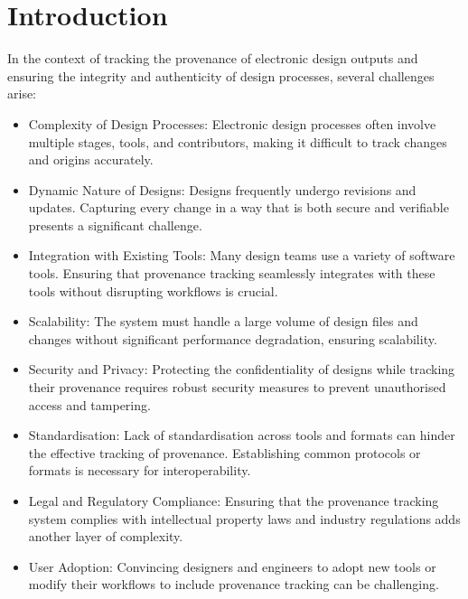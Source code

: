 \documentclass{tufte-handout}
\begin{document}
\section{Introduction}
In the context of tracking the provenance of electronic design outputs and ensuring the integrity and authenticity of design processes, several challenges arise:
\begin{itemize}
    \item Complexity of Design Processes: Electronic design processes often involve multiple stages, tools, and contributors, making it difficult
    to track changes and origins accurately.
    \item Dynamic Nature of Designs: Designs frequently undergo revisions and updates. Capturing every change in a way that is both secure and verifiable
    presents a significant challenge.
    \item Integration with Existing Tools: Many design teams use a variety of software tools. Ensuring that provenance tracking seamlessly integrates with
    these tools without disrupting workflows is crucial.
    \item Scalability: The system must handle a large volume of design files and changes without significant performance degradation, ensuring scalability.
    \item Security and Privacy: Protecting the confidentiality of designs while tracking their provenance requires robust security measures to prevent unauthorised
    access and tampering.
    \item Standardisation: Lack of standardisation across tools and formats can hinder the effective tracking of provenance. Establishing common protocols or
    formats is necessary for interoperability.
    \item Legal and Regulatory Compliance: Ensuring that the provenance tracking system complies with intellectual property laws and industry regulations
    adds another layer of complexity.
    \item User Adoption: Convincing designers and engineers to adopt new tools or modify their workflows to include provenance tracking can be challenging.
\end{itemize}
\end{document}

